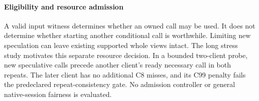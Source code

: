 \paragraph{Eligibility and resource admission}
A valid input witness determines whether an owned call may be used.
It does not determine whether starting another conditional call is
worthwhile. Limiting new speculation can leave existing supported whole
views intact. The long stress study motivates this separate resource
decision. In a bounded two-client probe, new speculative calls precede
another client's ready necessary call in both repeats. The later client
has no additional C8 misses, and its C99 penalty fails the predeclared
repeat-consistency gate. No admission controller or general native-session
fairness is evaluated.
